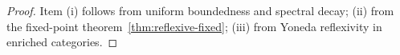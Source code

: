 \begin{proof}
Item (i) follows from uniform boundedness and spectral decay;
(ii) from the fixed-point theorem~\ref{thm:reflexive-fixed};
(iii) from Yoneda reflexivity in enriched categories. \relax
\end{proof}

